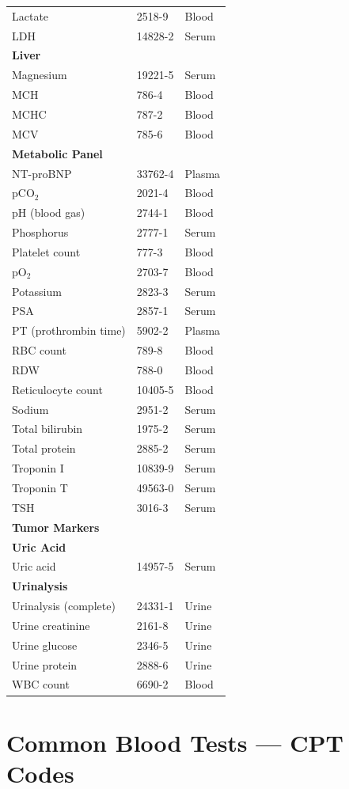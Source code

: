 \begin{longtable}{@{}lll@{}}
Lactate & 2518-9 & Blood \\
LDH & 14828-2 & Serum \\
\textbf{Liver} & & \\
Magnesium & 19221-5 & Serum \\
MCH & 786-4 & Blood \\
MCHC & 787-2 & Blood \\
MCV & 785-6 & Blood \\
\textbf{Metabolic Panel} & & \\
NT-proBNP & 33762-4 & Plasma \\
pCO$_2$ & 2021-4 & Blood \\
pH (blood gas) & 2744-1 & Blood \\
Phosphorus & 2777-1 & Serum \\
Platelet count & 777-3 & Blood \\
pO$_2$ & 2703-7 & Blood \\
Potassium & 2823-3 & Serum \\
PSA & 2857-1 & Serum \\
PT (prothrombin time) & 5902-2 & Plasma \\
RBC count & 789-8 & Blood \\
RDW & 788-0 & Blood \\
Reticulocyte count & 10405-5 & Blood \\
Sodium & 2951-2 & Serum \\
Total bilirubin & 1975-2 & Serum \\
Total protein & 2885-2 & Serum \\
Troponin I & 10839-9 & Serum \\
Troponin T & 49563-0 & Serum \\
TSH & 3016-3 & Serum \\
\textbf{Tumor Markers} & & \\
\textbf{Uric Acid} & & \\
Uric acid & 14957-5 & Serum \\
\textbf{Urinalysis} & & \\
Urinalysis (complete) & 24331-1 & Urine \\
Urine creatinine & 2161-8 & Urine \\
Urine glucose & 2346-5 & Urine \\
Urine protein & 2888-6 & Urine \\
WBC count & 6690-2 & Blood \\
\bottomrule
\end{longtable}

\clearpage
\section{Common Blood Tests --- CPT Codes}

